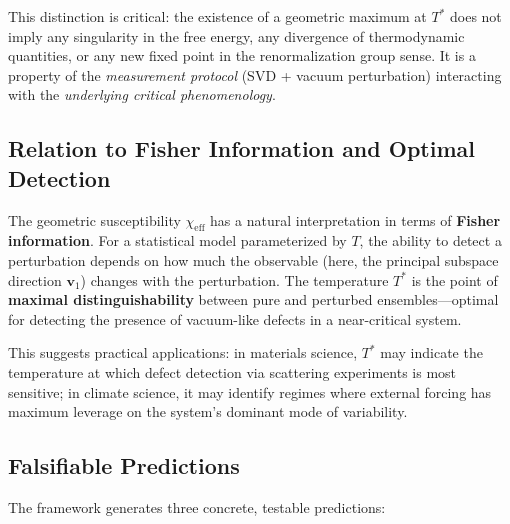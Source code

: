 \documentclass[aps,prl,twocolumn,superscriptaddress,byrevtex]{article}
\begin{document}
This distinction is critical: the existence of a geometric maximum at $T^*$ does not imply any singularity in the free energy, any divergence of thermodynamic quantities, or any new fixed point in the renormalization group sense. It is a property of the \emph{measurement protocol} (SVD + vacuum perturbation) interacting with the \emph{underlying critical phenomenology}.

\subsection{Relation to Fisher Information and Optimal Detection}

The geometric susceptibility $\chi_{\text{eff}}$ has a natural interpretation in terms of \textbf{Fisher information}. For a statistical model parameterized by $T$, the ability to detect a perturbation depends on how much the observable (here, the principal subspace direction $\mathbf{v}_1$) changes with the perturbation. The temperature $T^*$ is the point of \textbf{maximal distinguishability} between pure and perturbed ensembles---optimal for detecting the presence of vacuum-like defects in a near-critical system.

This suggests practical applications: in materials science, $T^*$ may indicate the temperature at which defect detection via scattering experiments is most sensitive; in climate science, it may identify regimes where external forcing has maximum leverage on the system's dominant mode of variability.

\subsection{Falsifiable Predictions}
\label{sec:predictions}

The framework generates three concrete, testable predictions:
\end{document}
